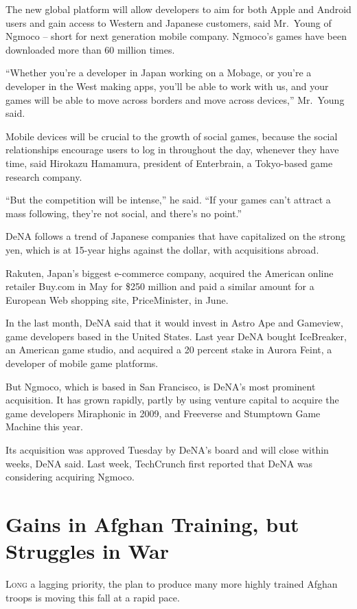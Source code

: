 ﻿\documentclass[12pt]{article}
\begin{document}
The new global platform will allow developers to aim for both Apple and Android users and gain
access to Western and Japanese customers, said Mr.~Young of Ngmoco -- short for next generation
mobile company. Ngmoco's games have been downloaded more than 60 million times.

``Whether you're a developer in Japan working on a Mobage, or you're a developer in the West making
apps, you'll be able to work with us, and your games will be able to move across borders and move
across devices,'' Mr.~Young said.

Mobile devices will be crucial to the growth of social games, because the social relationships
encourage users to log in throughout the day, whenever they have time, said Hirokazu Hamamura,
president of Enterbrain, a Tokyo-based game research company.

``But the competition will be intense,'' he said. ``If your games can't attract a mass following,
they're not social, and there's no point.''

DeNA follows a trend of Japanese companies that have capitalized on the strong yen, which is at
15-year highs against the dollar, with acquisitions abroad.

Rakuten, Japan's biggest e-commerce company, acquired the American online retailer Buy.com in May
for \$250 million and paid a similar amount for a European Web shopping site, PriceMinister, in
June.

In the last month, DeNA said that it would invest in Astro Ape and Gameview, game developers based
in the United States. Last year DeNA bought IceBreaker, an American game studio, and acquired a 20
percent stake in Aurora Feint, a developer of mobile game platforms.

But Ngmoco, which is based in San Francisco, is DeNA's most prominent acquisition. It has grown
rapidly, partly by using venture capital to acquire the game developers Miraphonic in 2009, and
Freeverse and Stumptown Game Machine this year.

Its acquisition was approved Tuesday by DeNA's board and will close within weeks, DeNA said. Last
week, TechCrunch first reported that DeNA was considering acquiring Ngmoco.

\section{Gains in Afghan Training, but Struggles in War}

\lettrine{L}{ong} a lagging priority, the plan to produce many more highly
trained Afghan troops is moving this fall at a rapid pace.
\end{document}
